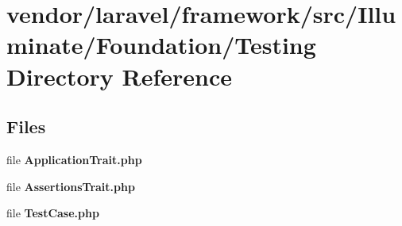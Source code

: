 \section{vendor/laravel/framework/src/\+Illuminate/\+Foundation/\+Testing Directory Reference}
\label{dir_b1276b7d3e252bebdb8f3e3f4449ef30}
\subsection*{Files}
\begin{DoxyCompactItemize}
\item 
file {\bf Application\+Trait.\+php}
\item 
file {\bf Assertions\+Trait.\+php}
\item 
file {\bf Test\+Case.\+php}
\end{DoxyCompactItemize}
